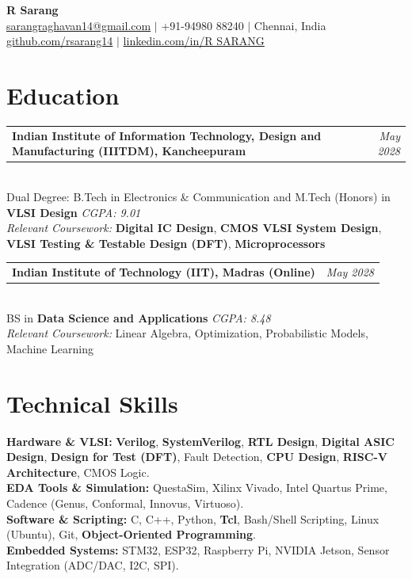 \documentclass[a4paper,10.5pt]{article}
\begin{document}
\begin{center}
    {\LARGE \textbf{R Sarang}}\\[3pt]
    \href{mailto:sarangraghavan14@gmail.com}{sarangraghavan14@gmail.com} $\mid$ +91-94980 88240 $\mid$ Chennai, India \\
    \href{https://github.com/rsarang14}{github.com/rsarang14} $\mid$ \href{https://www.linkedin.com/in/sarang-raghavan-a04a2b308}{linkedin.com/in/R SARANG}
\end{center}

\section*{Education}

\noindent
\begin{tabularx}{\linewidth}{@{}X r@{}}
\textbf{Indian Institute of Information Technology, Design and Manufacturing (IIITDM), Kancheepuram} & \textit{May 2028} \\
\end{tabularx}\\[1pt]
Dual Degree: B.Tech in Electronics \& Communication and M.Tech (Honors) in \textbf{VLSI Design} \hfill \textit{CGPA: 9.01}\\
\textit{Relevant Coursework:} \textbf{Digital IC Design}, \textbf{CMOS VLSI System Design}, \textbf{VLSI Testing \& Testable Design (DFT)}, \textbf{Microprocessors}


\noindent
\begin{tabularx}{\linewidth}{@{}X r@{}}
\textbf{Indian Institute of Technology (IIT), Madras (Online)} & \textit{May 2028} \\
\end{tabularx}\\[1pt]
BS in \textbf{Data Science and Applications} \hfill \textit{CGPA: 8.48}\\
\textit{Relevant Coursework:} Linear Algebra, Optimization, Probabilistic Models, Machine Learning

\section*{Technical Skills}
\textbf{Hardware \& VLSI:} \textbf{Verilog}, \textbf{SystemVerilog}, \textbf{RTL Design}, \textbf{Digital ASIC Design}, \textbf{Design for Test (DFT)}, Fault Detection, \textbf{CPU Design}, \textbf{RISC-V Architecture}, CMOS Logic.\\
\textbf{EDA Tools \& Simulation:} QuestaSim, Xilinx Vivado, Intel Quartus Prime, Cadence (Genus, Conformal, Innovus, Virtuoso).\\
\textbf{Software \& Scripting:} C, C++, Python, \textbf{Tcl}, Bash/Shell Scripting, Linux (Ubuntu), Git, \textbf{Object-Oriented Programming}.\\
\textbf{Embedded Systems:} STM32, ESP32, Raspberry Pi, NVIDIA Jetson, Sensor Integration (ADC/DAC, I2C, SPI).
\end{document}
